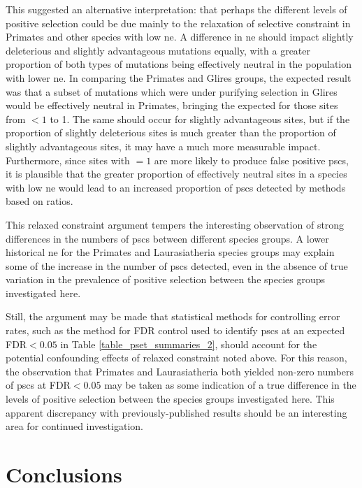 This suggested an alternative interpretation: that perhaps the
different levels of positive selection could be due mainly to the
relaxation of selective constraint in Primates and other species with
low \ac{ne}. A difference in \ac{ne} should impact slightly
deleterious and slightly advantageous mutations equally, with a
greater proportion of both types of mutations being effectively
neutral in the population with lower \ac{ne}. In comparing the
Primates and Glires groups, the expected result was that a subset of
mutations which were under purifying selection in Glires would be
effectively neutral in Primates, bringing the expected \omg for those
sites from $<1$ to 1. The same should occur for slightly advantageous
sites, but if the proportion of slightly deleterious sites is much
greater than the proportion of slightly advantageous sites, it may
have a much more measurable impact. Furthermore, since sites with
\dnds$=1$ are more likely to produce false positive \acp{psc}, it is
plausible that the greater proportion of effectively neutral sites in
a species with low \ac{ne} would lead to an increased proportion of
\acp{psc} detected by methods based on \dnds ratios.

This relaxed constraint argument tempers the interesting observation
of strong differences in the numbers of \acp{psc} between different
species groups. A lower historical \ac{ne} for the Primates and
Laurasiatheria species groups may explain some of the increase in the
number of \acp{psc} detected, even in the absence of true variation in
the prevalence of positive selection between the species groups
investigated here.

Still, the argument may be made that statistical methods for
controlling error rates, such as the \citet{Benjamini1995} method for
FDR control used to identify \acp{psc} at an expected FDR$<0.05$ in
Table \ref{table_pset_summaries_2}, should account for the potential
confounding effects of relaxed constraint noted above. For this
reason, the observation that Primates and Laurasiatheria both yielded
non-zero numbers of \acp{psc} at FDR$<0.05$ may be taken as some
indication of a true difference in the levels of positive selection
between the species groups investigated here. This apparent
discrepancy with previously-published results should be an interesting
area for continued investigation.

\section{Conclusions}

